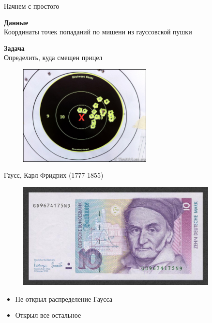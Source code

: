 \documentclass[10pt]{beamer}
\begin{document}
\begin{frame}{Начнем с простого}

{\bf Данные} \\ Координаты точек попаданий по мишени из гауссовской пушки 

{\bf Задача} \\ Определить, куда смещен прицел

\begin{figure}
	\centering
	 \includegraphics[width=0.6\textwidth]{images/target.jpg}       
\end{figure}

\end{frame}

\begin{frame}{Гаусс, Карл Фридрих (1777-1855)}

\begin{figure}
	\centering  
	\includegraphics[width=0.9\textwidth]{images/gauss.jpg}
\end{figure}

\begin{itemize}
\item Не открыл распределение Гаусса
\item Открыл все остальное
\end{itemize}

\end{frame}
\end{document}
